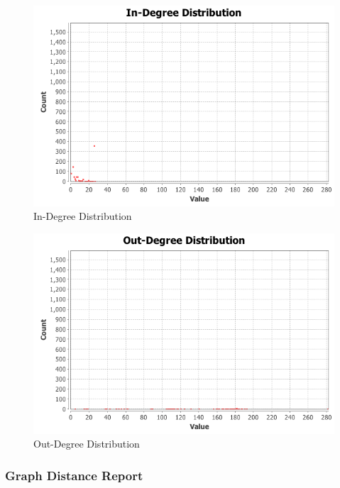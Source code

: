 \documentclass{article}
\begin{document}
\begin{figure}[H]
\centering
\includegraphics[scale=0.70]{q3/AverageDegreeReport/indegree-distribution}
\caption{In-Degree Distribution}
\label{degreedistribution}
\end{figure}

\begin{figure}[H]
\centering
\includegraphics[scale=0.70]{q3/AverageDegreeReport/outdegree-distribution}
\caption{Out-Degree Distribution}
\label{degreedistribution}
\end{figure}

\subsubsection*{Graph Distance Report}
\end{document}
